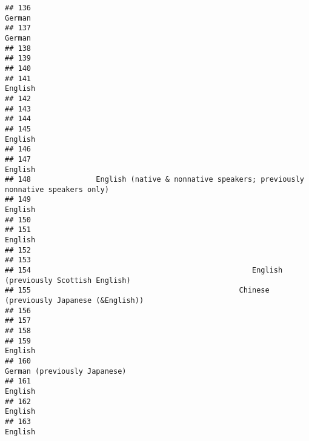 \documentclass[
  english,
  man]{apa6}
\begin{document}
\begin{verbatim}
## 136                                                                                  German
## 137                                                                                  German
## 138                                                                                        
## 139                                                                                        
## 140                                                                                        
## 141                                                                                 English
## 142                                                                                        
## 143                                                                                        
## 144                                                                                        
## 145                                                                                 English
## 146                                                                                        
## 147                                                                                 English
## 148               English (native & nonnative speakers; previously nonnative speakers only)
## 149                                                                                 English
## 150                                                                                        
## 151                                                                                 English
## 152                                                                                        
## 153                                                                                        
## 154                                                   English (previously Scottish English)
## 155                                                Chinese (previously Japanese (&English))
## 156                                                                                        
## 157                                                                                        
## 158                                                                                        
## 159                                                                                 English
## 160                                                            German (previously Japanese)
## 161                                                                                 English
## 162                                                                                 English
## 163                                                                                 English

\end{verbatim}
\end{document}
